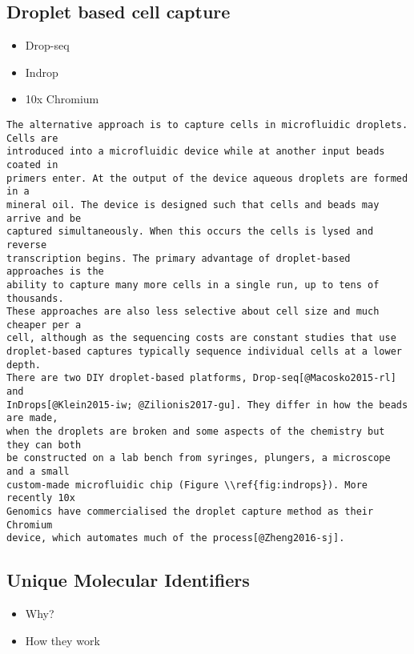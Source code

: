 \documentclass[11pt,a4paper,titlepage,twoside,openright]{style/unimelbthesis}
\theoremstyle{definition}
\theoremstyle{definition}
\theoremstyle{definition}
\theoremstyle{remark}
\begin{document}
\begin{mainmatter}
\hypertarget{droplet-based-cell-capture}{%
\subsection{Droplet based cell capture}\label{droplet-based-cell-capture}}

\begin{itemize}
\tightlist
\item
  Drop-seq
\item
  Indrop
\item
  10x Chromium
\end{itemize}

\begin{verbatim}
The alternative approach is to capture cells in microfluidic droplets. Cells are
introduced into a microfluidic device while at another input beads coated in
primers enter. At the output of the device aqueous droplets are formed in a
mineral oil. The device is designed such that cells and beads may arrive and be
captured simultaneously. When this occurs the cells is lysed and reverse
transcription begins. The primary advantage of droplet-based approaches is the
ability to capture many more cells in a single run, up to tens of thousands.
These approaches are also less selective about cell size and much cheaper per a
cell, although as the sequencing costs are constant studies that use
droplet-based captures typically sequence individual cells at a lower depth.
There are two DIY droplet-based platforms, Drop-seq[@Macosko2015-rl] and
InDrops[@Klein2015-iw; @Zilionis2017-gu]. They differ in how the beads are made,
when the droplets are broken and some aspects of the chemistry but they can both
be constructed on a lab bench from syringes, plungers, a microscope and a small
custom-made microfluidic chip (Figure \\ref{fig:indrops}). More recently 10x
Genomics have commercialised the droplet capture method as their Chromium
device, which automates much of the process[@Zheng2016-sj].
\end{verbatim}

\hypertarget{unique-molecular-identifiers}{%
\subsection{Unique Molecular Identifiers}\label{unique-molecular-identifiers}}

\begin{itemize}
\tightlist
\item
  Why?
\item
  How they work
\end{itemize}


\end{mainmatter}
\end{document}

